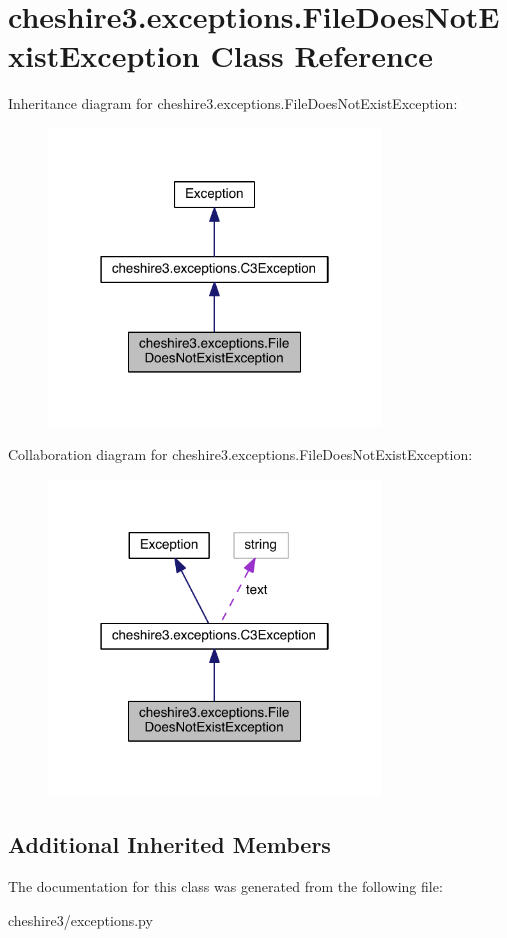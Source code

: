 \hypertarget{classcheshire3_1_1exceptions_1_1_file_does_not_exist_exception}{\section{cheshire3.\-exceptions.\-File\-Does\-Not\-Exist\-Exception Class Reference}
\label{classcheshire3_1_1exceptions_1_1_file_does_not_exist_exception}
}


Inheritance diagram for cheshire3.\-exceptions.\-File\-Does\-Not\-Exist\-Exception\-:
\nopagebreak
\begin{figure}[H]
\begin{center}
\leavevmode
\includegraphics[width=250pt]{classcheshire3_1_1exceptions_1_1_file_does_not_exist_exception__inherit__graph}
\end{center}
\end{figure}


Collaboration diagram for cheshire3.\-exceptions.\-File\-Does\-Not\-Exist\-Exception\-:
\nopagebreak
\begin{figure}[H]
\begin{center}
\leavevmode
\includegraphics[width=250pt]{classcheshire3_1_1exceptions_1_1_file_does_not_exist_exception__coll__graph}
\end{center}
\end{figure}
\subsection*{Additional Inherited Members}


The documentation for this class was generated from the following file\-:\begin{DoxyCompactItemize}
\item 
cheshire3/exceptions.\-py\end{DoxyCompactItemize}
